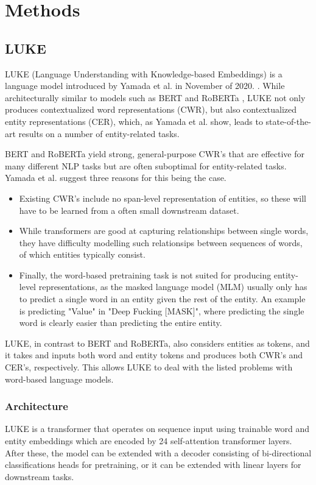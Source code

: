 \documentclass[main.tex]{subfiles}
\begin{document}
\chapter{Methods}

\section{LUKE}
LUKE (Language Understanding with Knowledge-based Embeddings) is a language model introduced by Yamada et al. in November of 2020. \cite{yamada2020luke}.
While architecturally similar to models such as BERT \cite{devlin2019bert} and RoBERTa \cite{liu2019roberta}, LUKE not only produces contextualized word representations (CWR), but also contextualized entity representations (CER), which, as Yamada et al. show, leads to state-of-the-art results on a number of entity-related tasks.

BERT \cite{devlin2019bert} and RoBERTa \cite{liu2019roberta} yield strong, general-purpose CWR's that are effective for many different NLP tasks but are often suboptimal for entity-related tasks.
Yamada et al. suggest three reasons for this being the case.
\begin{itemize}
    \item Existing CWR's include no span-level representation of entities, so these will have to be learned from a often small downstream dataset.
    \item While transformers are good at capturing relationships between single words, they have difficulty modelling such relationsips between sequences of words, of which entities typically consist.
    \item Finally, the word-based pretraining task is not suited for producing entity-level representations, as the masked language model (MLM) usually only has to predict a single word in an entity given the rest of the entity.
    An example is predicting "Value" in "Deep Fucking [MASK]", where predicting the single word is clearly easier than predicting the entire entity.
\end{itemize}
LUKE, in contrast to BERT and RoBERTa, also considers entities as tokens, and it takes and inputs both word and entity tokens and produces both CWR's and CER's, respectively.
This allows LUKE to deal with the listed problems with word-based language models.

\subsection{Architecture}
LUKE is a transformer that operates on sequence input using trainable word and entity embeddings which are encoded by 24 self-attention transformer layers.
After these, the model can be extended with a decoder consisting of bi-directional classifications heads for pretraining, or it can be extended with linear layers for downstream tasks.
\end{document}
